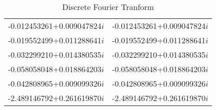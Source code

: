 \begin{table}[bth]
\begin{tabular}{cc}
-0.012453261+0.009047824$i$ & -0.012453261+0.009047824$i$ \\
-0.019552499+0.011288641$i$ & -0.019552499+0.011288641$i$ \\
-0.032299210+0.014380535$i$ & -0.032299210+0.014380535$i$ \\
-0.058058048+0.018864203$i$ & -0.058058048+0.018864203$i$ \\
-0.042808965+0.009099326$i$ & -0.042808965+0.009099326$i$ \\
-2.489146792+0.261619870$i$ & -2.489146792+0.261619870$i$ \\
\hline\hline
\end{tabular}
\caption{Discrete Fourier Tranform}
\label{tb}
\end{table}
